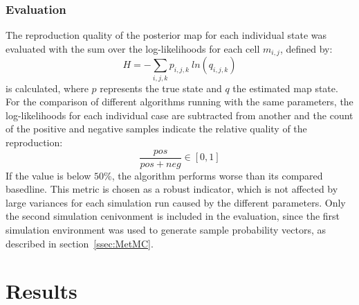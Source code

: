 \documentclass[twocolumn,letterpaper]{IEEEAerospaceCLS}  %
\begin{document}
\subsubsection{Evaluation}\label{ssec:MetEval}
The reproduction quality of the posterior map for each individual state was evaluated with the sum over the log-likelihoods for each cell $m_{i,j}$, defined by:
\begin{equation} \label{eq:Entropy}
    H = - \sum_{i,j,k} p_{i,j,k}~ln(q_{i,j,k})
\end{equation}
is calculated, where $p$ represents the true state and $q$ the estimated map state.\\
For the comparison of different algorithms running with the same parameters, the log-likelihoods for each individual case are subtracted from another and the count of the positive and negative samples indicate the relative quality of the reproduction:
\begin{equation} \label{eq:eval}
    \frac{pos}{pos+neg} \in [0, 1]
\end{equation} If the value is below $50$\%, the algorithm performs worse than its compared basedline. This metric is chosen as a robust indicator, which is not affected by large variances for each simulation run caused by the different parameters. 
Only the second simulation cenivonment is included in the evaluation, since the first simulation environment was used to generate sample probability vectors, as described in section~\ref{ssec:MetMC}.
\section{Results} \label{sec:Res}
\end{document}
